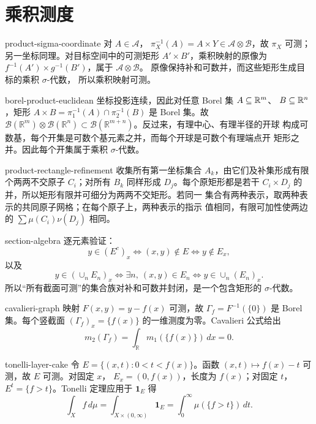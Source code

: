 \chapter{乘积测度}

\begin{solution}{product-sigma-coordinate}
对 \(A\in\mathcal A\)，
\(\pi_X^{-1}(A)=A\times Y\in\mathcal A\otimes\mathcal B\)，故
\(\pi_X\) 可测；另一坐标同理。对目标空间中的可测矩形
\(A'\times B'\)，乘积映射的原像为
\(f^{-1}(A')\times g^{-1}(B')\)，属于 \(\mathcal A\otimes\mathcal B\)。
原像保持补和可数并，而这些矩形生成目标的乘积 \(\sigma\)-代数，
所以乘积映射可测。
\end{solution}

\begin{solution}{borel-product-euclidean}
坐标投影连续，因此对任意 Borel 集 \(A\subseteq\mathbb{R}^m\)、
\(B\subseteq\mathbb{R}^n\)，矩形
\(A\times B=\pi_1^{-1}(A)\cap\pi_2^{-1}(B)\) 是 Borel 集。故
\(\mathcal B(\mathbb R^m)\otimes\mathcal B(\mathbb R^n)
\subset\mathcal B(\mathbb R^{m+n})\)。反过来，有理中心、有理半径的开球
构成可数基，每个开集是可数个基元素之并，而每个开球是可数个有理端点开
矩形之并。因此每个开集属于乘积 \(\sigma\)-代数。
\end{solution}

\begin{solution}{product-rectangle-refinement}
收集所有第一坐标集合 \(A_k\)，由它们及补集形成有限个两两不交原子
\(C_i\)；对所有 \(B_k\) 同样形成 \(D_j\)。每个原矩形都是若干
\(C_i\times D_j\) 的并，所以矩形有限并可细分为两两不交矩形。若同一
集合有两种表示，取两种表示的共同原子网格；在每个原子上，两种表示的指示
值相同，有限可加性使两边的
\(\sum\mu(C_i)\nu(D_j)\) 相同。
\end{solution}

\begin{solution}{section-algebra}
逐元素验证：
\[
 y\in(E^c)_x\iff(x,y)\notin E\iff y\notin E_x,
\]
以及
\[
 y\in(\cup_nE_n)_x\iff\exists n,\ (x,y)\in E_n
\iff y\in\cup_n(E_n)_x.
\]
所以“所有截面可测”的集合族对补和可数并封闭，是一个包含矩形的
\(\sigma\)-代数。
\end{solution}

\begin{solution}{cavalieri-graph}
映射 \(F(x,y)=y-f(x)\) 可测，故
\(\Gamma_f=F^{-1}(\{0\})\) 是 Borel 集。每个竖截面
\((\Gamma_f)_x=\{f(x)\}\) 的一维测度为零。Cavalieri 公式给出
\[
 m_2(\Gamma_f)=\int_\mathbb R m_1(\{f(x)\})\,dx=0.
\]
\end{solution}

\begin{solution}{tonelli-layer-cake}
令 \(E=\{(x,t):0<t<f(x)\}\)。函数
\((x,t)\mapsto f(x)-t\) 可测，故 \(E\) 可测。对固定 \(x\)，
\(E_x=(0,f(x))\)，长度为 \(f(x)\)；对固定 \(t\)，
\(E^t=\{f>t\}\)。Tonelli 定理应用于 \(\mathbf1_E\) 得
\[
 \int_Xf\,d\mu
 =\int_{X\times(0,\infty)}\mathbf1_E
 =\int_0^\infty\mu(\{f>t\})\,dt.
\]
\end{solution}

